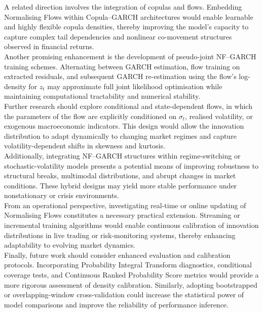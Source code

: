 \documentclass[oneside,12pt]{CUEDthesisPSnPDF}
\begin{document}
\medskip
\noindent
A related direction involves the integration of copulas and flows. Embedding Normalising Flows within Copula–GARCH architectures would enable learnable and highly flexible copula densities, thereby improving the model’s capacity to capture complex tail dependencies and nonlinear co-movement structures observed in financial returns.\\

\medskip
\noindent
Another promising enhancement is the development of pseudo-joint NF–GARCH training schemes. Alternating between GARCH estimation, flow training on extracted residuals, and subsequent GARCH re-estimation using the flow’s log-density for $z_t$ may approximate full joint likelihood optimisation while maintaining computational tractability and numerical stability.\\

\medskip
\noindent
Further research should explore conditional and state-dependent flows, in which the parameters of the flow are explicitly conditioned on $\sigma_t$, realised volatility, or exogenous macroeconomic indicators. This design would allow the innovation distribution to adapt dynamically to changing market regimes and capture volatility-dependent shifts in skewness and kurtosis.\\

\medskip
\noindent
Additionally, integrating NF–GARCH structures within regime-switching or stochastic-volatility models presents a potential means of improving robustness to structural breaks, multimodal distributions, and abrupt changes in market conditions. These hybrid designs may yield more stable performance under nonstationary or crisis environments.\\

\medskip
\noindent
From an operational perspective, investigating real-time or online updating of Normalising Flows constitutes a necessary practical extension. Streaming or incremental training algorithms would enable continuous calibration of innovation distributions in live trading or risk-monitoring systems, thereby enhancing adaptability to evolving market dynamics.\\

\medskip
\noindent
Finally, future work should consider enhanced evaluation and calibration protocols. Incorporating Probability Integral Transform diagnostics, conditional coverage tests, and Continuous Ranked Probability Score metrics would provide a more rigorous assessment of density calibration. Similarly, adopting bootstrapped or overlapping-window cross-validation could increase the statistical power of model comparisons and improve the reliability of performance inference.\\
\end{document}
